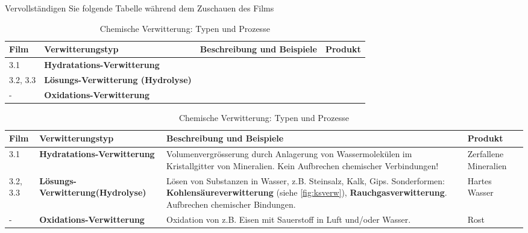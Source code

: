 \begin{myexercise}
Vervollständigen Sie folgende Tabelle während dem Zuschauen des Films
\begin{table}[H]
\centering
\begin{tabular}{@{}l|p{3cm}||p{6cm}|p{3cm}@{}}
\toprule
\tiny Film &\textbf{Verwitterungstyp} & \textbf{Beschreibung und Beispiele} & \textbf{Produkt} \\
\midrule\midrule
\tiny 3.1 & \textbf{Hydratations-Verwitterung} & &  \\[50pt] \midrule
\tiny 3.2, 3.3 & \textbf{Lösungs-Verwitterung \newline (Hydrolyse)} & & \\[50pt] \midrule
\tiny - &\textbf{Oxidations-Verwitterung} & & \\[50pt] \bottomrule

\end{tabular}
\caption{Chemische Verwitterung: Typen und Prozesse}
\end{table}
\begin{myanswer}
\begin{table}[H]
\centering
\begin{tabular}{@{}l|p{3cm}||p{6cm}|p{3cm}@{}}
\toprule
\small
\tiny Film &\textbf{Verwitterungstyp} & \textbf{Beschreibung und Beispiele} & \textbf{Produkt} \\
\midrule\midrule
\tiny 3.1 & \textbf{Hydratations-Verwitterung} & Volumenvergrösserung durch Anlagerung von Wassermolekülen im Kristallgitter von Mineralien. Kein Aufbrechen chemischer Verbindungen! & Zerfallene Mineralien \\\midrule
\tiny 3.2, 3.3 &\textbf{Lösungs-Verwitterung\newline (Hydrolyse)} & Lösen von Substanzen in Wasser, z.B. Steinsalz, Kalk, Gips. \newline Sonderformen: \textbf{Kohlensäureverwitterung} (siehe \cref{fig:ksverw}), \textbf{Rauchgasverwitterung}. Aufbrechen chemischer Bindungen. & Hartes Wasser \\\midrule
\tiny - &\textbf{Oxidations-Verwitterung} & Oxidation von z.B. Eisen mit Sauerstoff in Luft und/oder Wasser. & Rost \\\bottomrule

\end{tabular}
\caption{Chemische Verwitterung: Typen und Prozesse}
\end{table}
\end{myanswer}
\end{myexercise}

